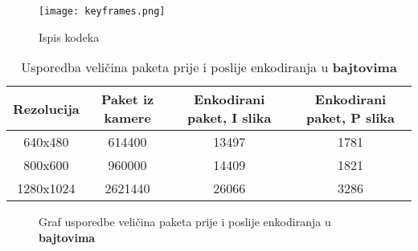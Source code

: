 \clearpage

\begin{figure}
  \texttt{[image: keyframes.png]}
  \caption{Ispis kodeka}
\end{figure}

\begin{center}
  \begin{table}[h]
    \begin{tabular}{|c|c|c|c|}
      \hline
      Rezolucija & Paket iz kamere & Enkodirani paket, I slika & Enkodirani paket, P slika \\
      \hline
      640x480 & 614400 & 13497 & 1781 \\[0.5cm]
      800x600 & 960000 & 14409 & 1821 \\[0.5cm]
      1280x1024 & 2621440 & 26066 & 3286 \\[0.5cm]
      \hline
    \end{tabular}
    \caption[Usporedba veličina paketa prije i poslije enkodiranja]{Usporedba veličina paketa prije i poslije enkodiranja u \textbf{bajtovima}}
\end{table}
\end{center}

\begin{figure}[h]
  \centering
  \caption[Graf usporedbe veličina paketa prije i poslije enkodiranja]{Graf usporedbe veličina paketa prije i poslije enkodiranja u \textbf{bajtovima}} \label{pic:packet_size}
\end{figure}

